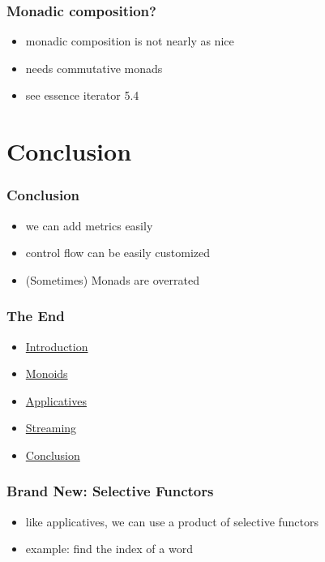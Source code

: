 \documentclass[aspectratio=169]{beamer}
\begin{document}
\begin{frame}
  \frametitle{Monadic composition?}
  \begin{itemize}
  \item monadic composition is not nearly as nice
  \item needs commutative monads
  \item see essence iterator 5.4
  \end{itemize}
\end{frame}

\section{Conclusion}\label{sec:conclusion}

\begin{frame}
  \frametitle{Conclusion}
  \begin{itemize}
  \item we can add metrics easily
  \item control flow can be easily customized
  \item (Sometimes) Monads are overrated
  \end{itemize}
\end{frame}

\begin{frame}
  \frametitle{The End}
  \begin{itemize}
  \item \hyperref[sec:introduction]{Introduction}
  \item \hyperref[sec:monoids]{Monoids}
  \item \hyperref[sec:applicatives]{Applicatives}
  \item \hyperref[sec:streaming]{Streaming}
  \item \hyperref[sec:conclusion]{Conclusion}
  \end{itemize}
\end{frame}

\appendix{}

\begin{frame}
  \frametitle{Brand New: Selective Functors}
  \begin{itemize}
  \item like applicatives, we can use a product of selective functors
  \item example: find the index of a word
  \end{itemize}
\end{frame}
\end{document}
